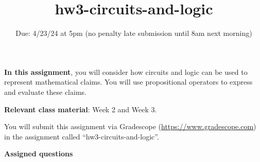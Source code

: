 


\title{hw3-circuits-and-logic}
\date{Due: 4/23/24 at 5pm (no penalty late submission until 8am next morning)}

\maketitle
\thispagestyle{fancy}

{\bf In this assignment}, you will consider how circuits and logic can be used to represent
mathematical claims. You will use propositional operators
to express and evaluate these claims.

{\bf Relevant class material}: Week 2 and Week 3.

You will submit this assignment via Gradescope
(\href{https://www.gradescope.com}{https://www.gradescope.com}) 
in the assignment called ``hw3-circuits-and-logic''.

\instructions

{\bf Assigned questions}

